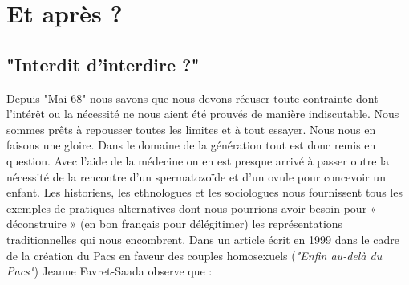


 \chapter[Et après ?]{Et après ?}


\section{"Interdit d'interdire ?"} 

  Depuis "Mai 68" nous savons que nous devons récuser toute contrainte dont l'intérêt ou la nécessité ne nous aient été prouvés de manière indiscutable. Nous sommes prêts à repousser toutes les limites et à tout essayer. Nous nous en faisons une gloire. Dans le domaine de la génération tout est donc remis en question. Avec l'aide de la médecine on en est presque arrivé à passer outre la nécessité de la rencontre d'un spermatozoïde et d'un ovule pour concevoir un enfant. Les historiens, les ethnologues et les sociologues nous fournissent tous les exemples de pratiques alternatives dont nous pourrions avoir besoin pour « déconstruire » (en bon français pour délégitimer) les représentations traditionnelles qui nous encombrent. Dans un article écrit en 1999 dans le cadre de la création du Pacs en faveur des couples homosexuels (\emph{"Enfin au-delà du Pacs"}) Jeanne Favret-Saada observe que :
